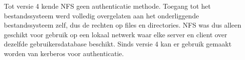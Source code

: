 Tot versie 4 kende NFS geen authenticatie methode. Toegang tot het bestandssysteem werd volledig overgelaten aan het onderliggende bestandssysteem zelf, dus de rechten op files en directories. NFS was dus alleen geschikt voor gebruik op een lokaal netwerk waar elke server en client over dezelfde gebruikersdatabase beschikt. Sinds versie 4 kan er gebruik gemaakt worden van kerberos voor authenticatie.

